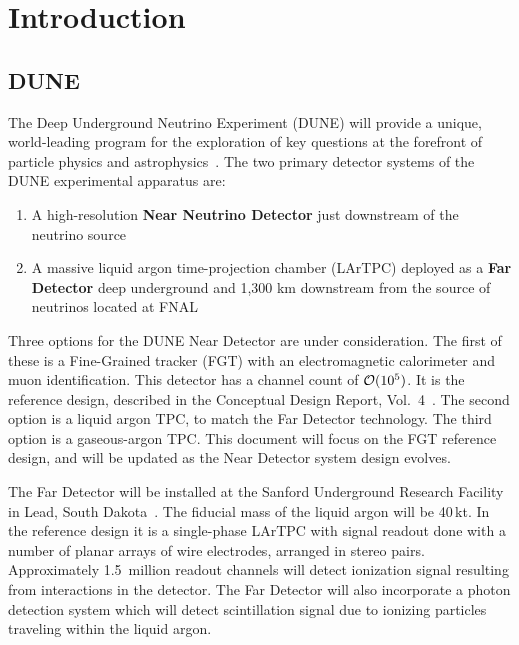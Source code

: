\section{Introduction}
\subsection{DUNE}

The Deep Underground Neutrino Experiment (DUNE) will provide a unique, world-leading program
for the exploration of key questions at the forefront of particle physics and astrophysics~\cite{sciopps,cdr_vol2}.
The two primary detector systems of the DUNE experimental apparatus are:

\begin{enumerate}

\item A high-resolution \textbf{Near Neutrino Detector} just downstream of the neutrino source
\item A massive liquid argon time-projection chamber (LArTPC) deployed as a \textbf{Far
Detector} deep underground and 1,300 km downstream from the source of neutrinos located at FNAL

\end{enumerate}

\noindent
Three options for the DUNE Near Detector are under consideration.  The first of these is a Fine-Grained tracker (FGT) with
an electromagnetic calorimeter and muon identification.  This detector has a channel count of ${\cal O}(10^{5})$.  It is
the reference design, described in the Conceptual Design Report, Vol.~4~\cite{cdr_vol4_docdb}.  The second option is a liquid argon
TPC, to match the Far Detector technology.  The third option is a gaseous-argon TPC.  This document will focus on the FGT reference
design, and will be updated as the Near Detector system design evolves.

The Far Detector will be installed at the Sanford Underground Research Facility in Lead, South Dakota~\cite{surf}.
The fiducial mass of the liquid argon will be 40\,kt. In the reference design it is a single-phase LArTPC
with signal readout done with a number of planar arrays of wire electrodes, arranged in stereo pairs.
Approximately 1.5~million readout channels will detect ionization signal resulting from interactions in the detector. 
The Far Detector will also incorporate a photon detection system which will detect scintillation
signal due to ionizing particles traveling within the liquid argon.

